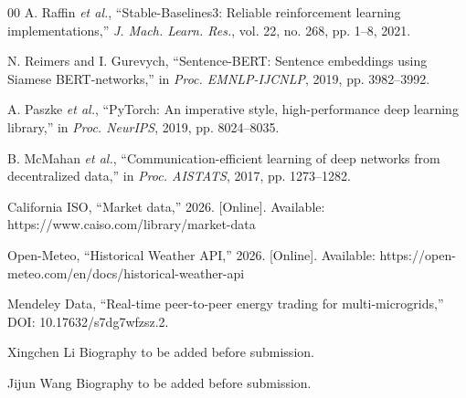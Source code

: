 \documentclass{ieeeaccess}
\begin{document}
\begin{thebibliography}{00}
 A. Raffin \emph{et al.}, ``Stable-Baselines3: Reliable reinforcement learning implementations,'' \emph{J. Mach. Learn. Res.}, vol. 22, no. 268, pp. 1--8, 2021.

 N. Reimers and I. Gurevych, ``Sentence-BERT: Sentence embeddings using Siamese BERT-networks,'' in \emph{Proc. EMNLP-IJCNLP}, 2019, pp. 3982--3992.

 A. Paszke \emph{et al.}, ``PyTorch: An imperative style, high-performance deep learning library,'' in \emph{Proc. NeurIPS}, 2019, pp. 8024--8035.

 B. McMahan \emph{et al.}, ``Communication-efficient learning of deep networks from decentralized data,'' in \emph{Proc. AISTATS}, 2017, pp. 1273--1282.

 California ISO, ``Market data,'' 2026. [Online]. Available: https://www.caiso.com/library/market-data

 Open-Meteo, ``Historical Weather API,'' 2026. [Online]. Available: https://open-meteo.com/en/docs/historical-weather-api

 Mendeley Data, ``Real-time peer-to-peer energy trading for multi-microgrids,'' DOI: 10.17632/s7dg7wfzsz.2.

\end{thebibliography}


\begin{IEEEbiography}{Xingchen Li} Biography to be added before submission.

\end{IEEEbiography}

\begin{IEEEbiography}{Jijun Wang} Biography to be added before submission.

\end{IEEEbiography}

\EOD
\end{document}
